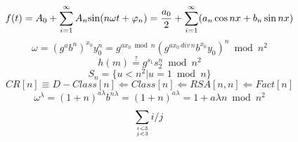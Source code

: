 \documentclass{article}
\begin{document}
\begin{CJK*}{GBK}{song}

\begin{equation}
f(t)=A_0 + \sum _{i=1}^{\infty} A_n{\rm sin}{(n\omega t+\varphi _n) }=\frac{a_0}{2}+ \sum _{i=1}^{\infty}
(a_n\cos nx + b_n\sin nx)
\end{equation}
\begin{equation}
\omega = (g^a b^n)^{x_0}y_0^n=g^{ax_0  \bmod  n}
(g^{ax_0 \, div \, n } b^{x_0}y_0)^n
\bmod  n^2
\end{equation}
\begin{equation}
h(m) \stackrel {?}{=}  g^{s_1}s_2^n \bmod n^2
\end{equation}
\begin{equation}
S_n = \{u<n^2|u=1 \bmod n \}
\end{equation}
\begin{equation}
CR[n] \equiv D-Class[n] \Leftarrow Class[n] \Leftarrow RSA[n,n] \Leftarrow Fact[n]
\end{equation}
\begin{equation}
\omega ^{\lambda} = (1+n)^{a \lambda}b^{n \lambda} = (1+n)^{a \lambda} =1+a\lambda n\bmod n^2
\end{equation}
\begin{equation}
\sum _{i<3  \atop j<3} i/j
\end{equation}
\end{CJK*}
\end{document}
